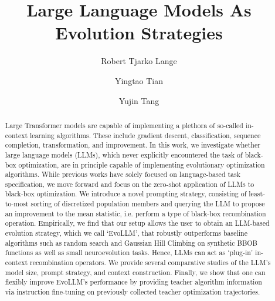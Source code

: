 \documentclass[sigconf]{acmart}
\newcommand{\yujin}[1]{\textcolor{blue}{\textbf{Yujin:} #1}}
\begin{document}
\title{Large Language Models As Evolution Strategies}


\author{Robert Tjarko Lange}

\author{Yingtao Tian}

\author{Yujin Tang}




\renewcommand{\shortauthors}{Lange et al.}


\begin{abstract}
Large Transformer models are capable of implementing a plethora of so-called in-context learning algorithms.
%
These include gradient descent, classification, sequence completion, transformation, and improvement. 
%
In this work, we investigate whether large language models (LLMs), which never explicitly encountered the task of black-box optimization, are in principle capable of implementing evolutionary optimization algorithms.
%
While previous works have solely focused on language-based task specification, we move forward and focus on the zero-shot application of LLMs to black-box optimization. We introduce a novel prompting strategy, consisting of least-to-most sorting of discretized population members and querying the LLM to propose an improvement to the mean statistic, i.e. perform a type of black-box recombination operation.
%
Empirically, we find that our setup allows the user to obtain an LLM-based evolution strategy, which we call `EvoLLM', that robustly outperforms baseline algorithms such as random search and Gaussian Hill Climbing on synthetic BBOB functions as well as small neuroevolution tasks.
%
Hence, LLMs can act as `plug-in' in-context recombination operators.
%
We provide several comparative studies of the LLM's model size, prompt strategy, and context construction.
%
Finally, we show that one can flexibly improve EvoLLM's performance by providing teacher algorithm information via instruction fine-tuning on previously collected teacher optimization trajectories.
\end{abstract}
\end{document}
